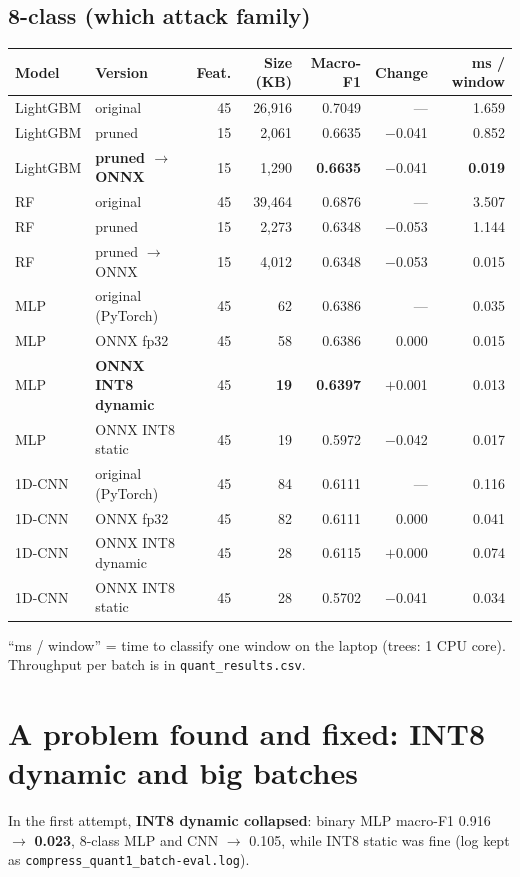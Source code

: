 \documentclass[11pt]{article}
\begin{document}
\subsection*{8-class (which attack family)}
\begin{longtable}{@{}l l r r r r r@{}}
\toprule
\textbf{Model} & \textbf{Version} & \textbf{Feat.} & \textbf{Size (KB)} & \textbf{Macro-F1} & \textbf{Change} & \textbf{ms / window} \\
\midrule
\endhead
LightGBM & original & 45 & 26,916 & 0.7049 & --- & 1.659 \\
LightGBM & pruned & 15 & 2,061 & 0.6635 & $-$0.041 & 0.852 \\
LightGBM & \textbf{pruned $\rightarrow$ ONNX} & 15 & 1,290 & \textbf{0.6635} & $-$0.041 & \textbf{0.019} \\
\midrule
RF & original & 45 & 39,464 & 0.6876 & --- & 3.507 \\
RF & pruned & 15 & 2,273 & 0.6348 & $-$0.053 & 1.144 \\
RF & pruned $\rightarrow$ ONNX & 15 & 4,012 & 0.6348 & $-$0.053 & 0.015 \\
\midrule
MLP & original (PyTorch) & 45 & 62 & 0.6386 & --- & 0.035 \\
MLP & ONNX fp32 & 45 & 58 & 0.6386 & 0.000 & 0.015 \\
MLP & \textbf{ONNX INT8 dynamic} & 45 & \textbf{19} & \textbf{0.6397} & $+$0.001 & 0.013 \\
MLP & ONNX INT8 static & 45 & 19 & 0.5972 & $-$0.042 & 0.017 \\
\midrule
1D-CNN & original (PyTorch) & 45 & 84 & 0.6111 & --- & 0.116 \\
1D-CNN & ONNX fp32 & 45 & 82 & 0.6111 & 0.000 & 0.041 \\
1D-CNN & ONNX INT8 dynamic & 45 & 28 & 0.6115 & $+$0.000 & 0.074 \\
1D-CNN & ONNX INT8 static & 45 & 28 & 0.5702 & $-$0.041 & 0.034 \\
\bottomrule
\end{longtable}
``ms / window'' = time to classify one window on the laptop (trees: 1 CPU core). Throughput per batch is in \texttt{quant\_results.csv}.

\newpage
\section{A problem found and fixed: INT8 dynamic and big batches}
In the first attempt, \textbf{INT8 dynamic collapsed}: binary MLP macro-F1 0.916 $\rightarrow$ \textbf{0.023}, 8-class MLP and CNN $\rightarrow$ 0.105,
while INT8 static was fine (log kept as \texttt{compress\_quant1\_batch-eval.log}).
\end{document}
